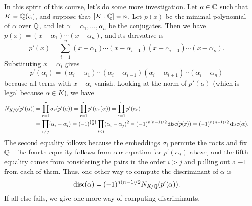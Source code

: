 In this spirit of this course, let's do some more investigation. Let 
$\alpha \in \mathbb{C}$ such that $K = \mathbb{Q}(\alpha)$, and suppose that 
$[K : \mathbb{Q}] = n$. Let $p(x)$ be the minimal polynomial of $\alpha$ over 
$\mathbb{Q}$, and let $\alpha = \alpha_1, \dots, \alpha_n$ be the conjugates. 
Then we have $p(x) = (x - \alpha_1) \cdots (x - \alpha_n)$, and its 
derivative is 
\[ p'(x) = \sum_{i=1}^n (x - \alpha_1) \cdots (x - \alpha_{i-1}) 
(x - \alpha_{i+1}) \cdots (x - \alpha_n). \] 
Substituting $x = \alpha_i$ gives 
\[ p'(\alpha_i) = (\alpha_i - \alpha_1) \cdots (\alpha_i - \alpha_{i-1}) 
(\alpha_i - \alpha_{i+1}) \cdots (\alpha_i - \alpha_n) \] 
because all terms with $x - \alpha_i$ vanish. Looking at the norm 
of $p'(\alpha)$ (which is legal because $\alpha \in K$), we have 
\begin{align*}
    N_{K/\mathbb{Q}}(p'(\alpha)) 
    &= \prod_{r=1}^n \sigma_r(p'(\alpha)) 
    = \prod_{r=1}^n p'(\sigma_r(\alpha)) 
    = \prod_{r=1}^n p'(\alpha_r) \\ 
    &= \prod_{i\neq j} (\alpha_i - \alpha_j) 
    = (-1)^{\binom{n}{2}} \prod_{i<j} (\alpha_i - \alpha_j)^2
    = (-1)^{n(n-1)/2} \operatorname{disc}(p(x)) = (-1)^{n(n-1)/2} \operatorname{disc}(\alpha). 
\end{align*}
The second equality follows because the embeddings $\sigma_i$ permute the 
roots and fix $\mathbb{Q}$. The fourth equality follows from our equation for 
$p'(\alpha_i)$ above, and the fifth equality comes from considering the 
pairs in the order $i > j$ and pulling out a $-1$ from each of them.
Thus, one other way to compute the discriminant of $\alpha$ is 
\[ \operatorname{disc}(\alpha) = (-1)^{n(n-1)/2} N_{K/\mathbb{Q}}(p'(\alpha)). \] 
If all else fails, we give one more way of computing discriminants. 

